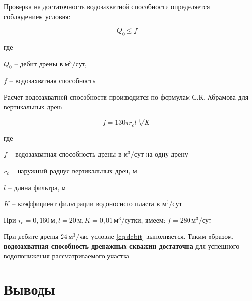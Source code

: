 \documentclass[a4paper,12pt]{article} %
\begin{document}
Проверка на достаточность водозахватной способности определяется соблюдением условия:

\begin{equation}\label{eq:debit}
	Q_0 \leqslant f 
\end{equation}

	где 
	
	$Q_0$ -- дебит дрены в $м^3/сут$, 
	
	$f$ -- водозахватная способность

	\bigskip

Расчет водозахватной способности производится по формулам С.К. Абрамова для вертикальных дрен:

\begin{equation}\label{eq:abramov}
	f = 130 \pi r_c l \sqrt[3]{K}
\end{equation}

	где 

	$f$ -- водозахватная способность дрены в $м^3/сут$ на одну дрену
	
	$r_c$ -- наружный радиус вертикальных дрен, м
	
	$l$ -- длина фильтра, м
	
	$K$ -- коэффициент фильтрации водоносного пласта в $м^3/сут$
	
	\bigskip
	
	При $r_c = 0,160 \, м, l = 20 \, м, K = 0,01 \, м^3/сутки $, имеем: $f = 280 \, м^3 / сут$

	\bigskip
	
При дебите дрены $24 \, м^3/час$ условие \eqref{eq:debit} выполняется. Таким образом, \textbf{водозахватная способность дренажных скважин достаточна} для успешного водопонижения рассматриваемого участка.

\section{Выводы}
\end{document}
